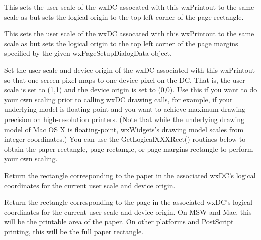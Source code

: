 This sets the user scale of the wxDC assocated with this wxPrintout to the same
scale as  but sets
the logical origin to the top left corner of the page rectangle.


\label{wxprintoutmapscreensizetopagemargins}


This sets the user scale of the wxDC assocated with this wxPrintout to the same
scale as
 but
sets the logical origin to the top left corner of the page margins specified by
the given wxPageSetupDialogData object.


\label{wxprintoutmapscreensizetodevice}


Set the user scale and device origin of the wxDC associated with this wxPrintout
so that one screen pixel maps to one device pixel on the DC. That is, the user
scale is set to (1,1) and the device origin is set to (0,0). Use this if you
want to do your own scaling prior to calling wxDC drawing calls, for example, if
your underlying model is floating-point and you want to achieve maximum drawing
precision on high-resolution printers. (Note that while the underlying drawing
model of Mac OS X is floating-point, wxWidgets's drawing model scales from integer
coordinates.) You can use the GetLogicalXXXRect() routines below to obtain the
paper rectangle, page rectangle, or page margins rectangle to perform your own scaling.


\label{wxprintoutgetlogicalpaperrect}


Return the rectangle corresponding to the paper in the associated wxDC's
logical coordinates for the current user scale and device origin.


\label{wxprintoutgetlogicalpagerect}


Return the rectangle corresponding to the page in the associated wxDC's
logical coordinates for the current user scale and device origin. 
On MSW and Mac, this will be the printable area of the paper. On other platforms
and PostScript printing, this will be the full paper rectangle.


